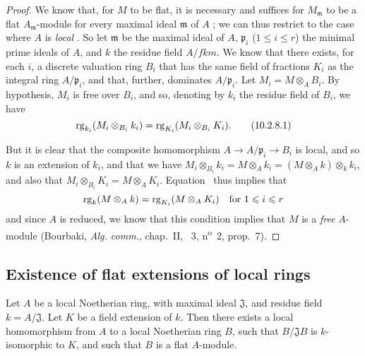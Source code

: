 \begin{proof}
We know that, for $M$ to be flat, it is necessary and suffices for $M_\mathfrak{m}$ to be a flat $A_\mathfrak{m}$-module for every maximal ideal $\mathfrak{m}$ of $A$ ;
we can thus restrict to the case where $A$ is \emph{local} .
So let $\mathfrak{m}$ be the maximal ideal of $A$, $\mathfrak{p}_i$ ($1\leq i\leq r$) the minimal prime ideals of $A$, and $k$ the residue field $A/fk{m}$.
We know  that there exists, for each $i$, a discrete valuation ring $B_i$ that has the same field of fractions $K_i$ as the integral ring $A/\mathfrak{p}_i$, and that, further, dominates $A/\mathfrak{p}_i$.
Let $M_i=M\otimes_A B_i$.
By hypothesis, $M_i$ is free over $B_i$, and so, denoting by $k_i$ the residue field of $B_i$, we have
\[
\label{0.10.2.8.1}
  \operatorname{rg}_{k_i}(M_i\otimes_{B_i}k_i)=\operatorname{rg}_{K_i}(M_i\otimes_{B_i}K_i).
  \tag{10.2.8.1}
\]

But it is clear that the composite homomorphism $A\to A/\mathfrak{p}_i\to B_i$ is local, and so $k$ is an extension of $k_i$, and that we have $M_i\otimes_{B_i}k_i = M\otimes_A k_i = (M\otimes_A k)\otimes_k k_i$, and also that $M_i\otimes_{B_i}K_i = M\otimes_A K_i$.
Equation~ thus implies that
\[
  \operatorname{rg}_k(M\otimes_A k)=\operatorname{rg}_{K_i}(M\otimes_A K_i)\quad\mbox{for $1\leqslant i\leqslant r$}
\]
and since $A$ is reduced, we know that this condition implies that $M$ is a \emph{free} $A$-module (Bourbaki, \emph{Alg. comm.}, chap.~II, \textsection~3, n\textsuperscript{o}~2, prop.~7).
\end{proof}

\subsection{Existence of flat extensions of local rings}
\label{subsection:0.10.3}

\begin{proposition}[10.3.1]
\label{0.10.3.1}
Let $A$ be a local Noetherian ring, with maximal ideal $\mathfrak{J}$, and residue field $k=A/\mathfrak{J}$.
Let $K$ be a field extension of $k$.
Then there exists a local homomorphism from $A$ to a local Noetherian ring $B$, such that $B/\mathfrak{J}B$ is $k$-isomorphic to $K$, and such that $B$ is a flat $A$-module.
\end{proposition}

